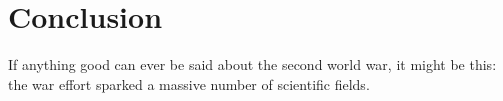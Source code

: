 \chapter{Conclusion}
\bigskip

\noindent If anything good can ever be said about the second world war, it might be this: the war effort sparked a massive number of scientific fields.
